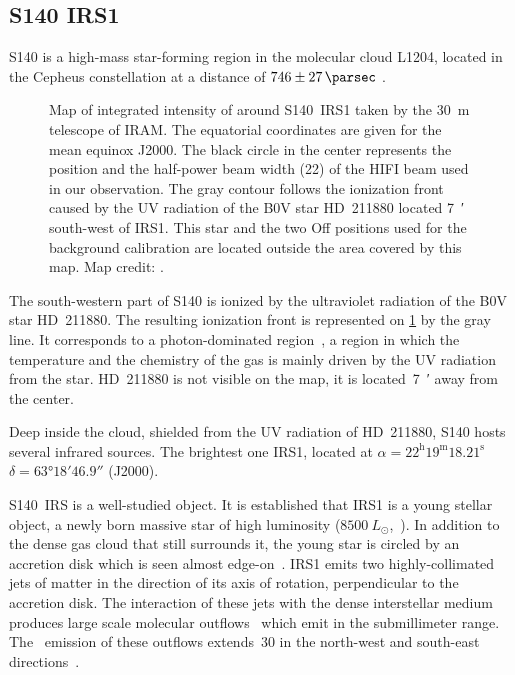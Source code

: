 \subsection{S140 IRS1}
\label{sec:s140irs1}
S140 is a high-mass star-forming region in the molecular cloud L1204,
located in the Cepheus constellation at a distance of $746\pm\SI{27}{\parsec}$ \parencite{hirota2008}.

\begin{figure}
    \centering
    
    \caption{
        Map of integrated intensity of  around S140~IRS1 taken by the \SI{30}{\meter} telescope of IRAM.
        The equatorial coordinates are given for the mean equinox J2000.
        The black circle in the center represents the position and the half-power beam width (\SI{22}{\arcsec}) of the HIFI beam used in our observation.
        The gray contour follows the ionization front caused by the UV radiation of the B0V star HD~211880 located \SI{7}{\arcmin} south-west of IRS1.
        This star and the two Off positions used for the background calibration are located outside the area covered by this map.
        Map credit: \textcite{koumpia2015}.
    }
    \label{fig:12CO10_moment0}
\end{figure}

The south-western part of S140 is ionized by the ultraviolet radiation of the B0V star HD~211880.
The resulting ionization front is represented on \cref{fig:12CO10_moment0} by the gray line.
It corresponds to a photon-dominated region~\parencite{hollenbach1997dense}, a region in which the temperature and the chemistry of the gas is mainly driven by the UV radiation from the star.
HD~211880 is not visible on the map, it is located~\SI{7}{\arcmin} away from the center.

Deep inside the cloud, shielded from the UV radiation of HD~211880, S140 hosts several infrared sources.
The brightest one IRS1, located at $\alpha = 22^\text{h} 19^\text{m} 18.21^\text{s}$ $\delta = \ang{63;18;46.9}$ (J2000).

S140~IRS is a well-studied object.
It is established that IRS1 is a young stellar object, a newly born massive star of high luminosity ($\SI{8500}{L_\odot}$,~\cite{maud2013s140}).
In addition to the dense gas cloud that still surrounds it, the young star is circled by an accretion disk which is seen almost edge-on~\parencite{maud2013s140}.
IRS1 emits two highly-collimated jets of matter in the direction of its axis of rotation, perpendicular to the accretion disk.
The interaction of these jets with the dense interstellar medium produces large scale molecular outflows~\parencite{reipurth2001herbig} which emit in the submillimeter range.
The~ emission of these outflows extends~\SI{30}{\arcsec} in the north-west and south-east directions~\parencite{maud2013s140}.

